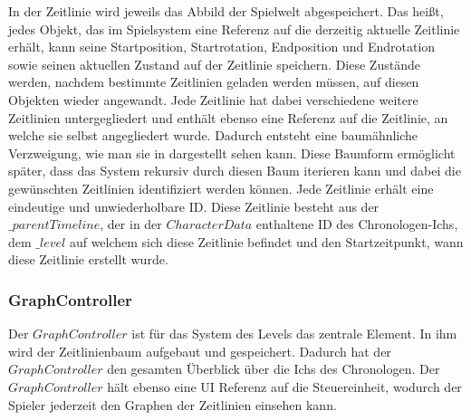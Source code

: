 In der Zeitlinie wird jeweils das Abbild der Spielwelt abgespeichert. Das heißt, jedes Objekt, das im Spielsystem eine Referenz auf die derzeitig aktuelle Zeitlinie erhält, kann seine Startposition, Startrotation, Endposition und Endrotation sowie seinen aktuellen Zustand auf der Zeitlinie speichern. Diese Zustände werden, nachdem bestimmte Zeitlinien geladen werden müssen, auf diesen Objekten wieder angewandt. Jede Zeitlinie hat dabei verschiedene weitere Zeitlinien untergegliedert und enthält ebenso eine Referenz auf die Zeitlinie, an welche sie selbst angegliedert wurde. Dadurch entsteht eine baumähnliche Verzweigung, wie man sie in  dargestellt sehen kann. Diese Baumform ermöglicht später, dass das System rekursiv durch diesen Baum iterieren kann und dabei die gewünschten Zeitlinien identifiziert werden können. Jede Zeitlinie erhält eine eindeutige und unwiederholbare \ac{ID}. Diese Zeitlinie besteht aus der $\_parentTimeline$, der in der $CharacterData$ enthaltene \ac{ID} des Chronologen-Ichs, dem $\_level$ auf welchem sich diese Zeitlinie befindet und den Startzeitpunkt, wann diese Zeitlinie erstellt wurde.
\subsubsection{GraphController}
Der $GraphController$ ist für das System des Levels das zentrale Element. In ihm wird der Zeitlinienbaum aufgebaut und gespeichert. Dadurch hat der $GraphController$ den gesamten Überblick über die Ichs des Chronologen. Der $GraphController$ hält ebenso eine \ac{UI} Referenz auf die Steuereinheit, wodurch der Spieler jederzeit den Graphen der Zeitlinien einsehen kann.

